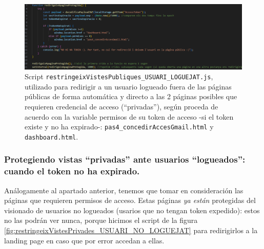 \documentclass[a4paper,12pt]{report}
\begin{document}
\setlength{\abovecaptionskip}{15pt}
\FloatBarrier
\begin{figure}[H]
	\centering
	\caption{Script \texttt{restringeixVistesPubliques\_USUARI\_LOGUEJAT.js}, utilizado para redirigir a un usuario logueado fuera de las páginas públicas de forma automática y directo a las 2 páginas posibles que requieren credencial de acceso (``privadas''), según proceda de acuerdo con la variable permisos de su token de acceso -si el token existe y no ha expirado-: \texttt{pas4\_concedirAccesGmail.html} y \texttt{dashboard.html}.}
	\includegraphics[width=1\linewidth]{img/restringeixVistesPubliques_USUARI_LOGUEJAT.png}
	
	\label{fig:restringeixVistesPubliquesUSUARILOGUEJAT}
\end{figure}
\FloatBarrier	
	


	
\subsubsection{Protegiendo vistas ``privadas'' ante usuarios ``logueados'': cuando el token no ha expirado.}
\label{sec:vistasPermisosPrivat}

Análogamente al apartado anterior, tenemos que tomar en consideración las páginas que requieren permisos de acceso. Estas páginas \textit{ya están} protegidas del visionado de usuarios no logueados (usarios que no tengan token expedido): estos no las podrán ver nunca, porque hicimos el script de la figura \ref{fig:restringeixVistesPrivades_USUARI_NO_LOGUEJAT} para redirigirlos a la landing page en caso que por error accedan a ellas.
\end{document}
